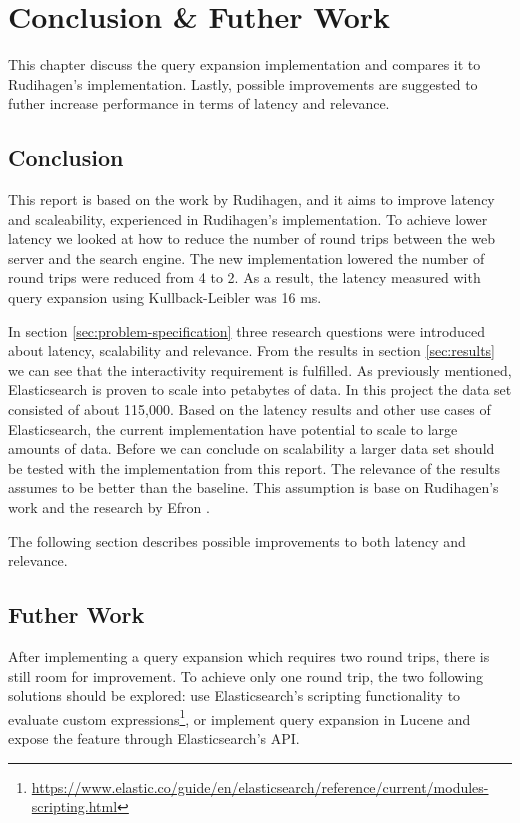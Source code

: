 \chapter{Conclusion \& Futher Work}
\label{ch:conclusion}
This chapter discuss the query expansion implementation and compares it to Rudihagen's implementation.
Lastly, possible improvements are suggested to futher increase performance in terms of latency and relevance.

\section{Conclusion}
This report is based on the work by Rudihagen, and it aims to improve latency and scaleability, experienced in Rudihagen's implementation.
To achieve lower latency we looked at how to reduce the number of round trips between the web server and the search engine.
The new implementation lowered the number of round trips were reduced from 4 to 2.
As a result, the latency measured with query expansion using Kullback-Leibler was 16 ms.

In section \ref{sec:problem-specification} three research questions were introduced about latency, scalability and relevance.
From the results in section \ref{sec:results} we can see that the interactivity requirement is fulfilled.
As previously mentioned, Elasticsearch is proven to scale into petabytes of data.
In this project the data set consisted of about 115,000.
Based on the latency results and other use cases of Elasticsearch,
the current implementation have potential to scale to large amounts of data.
Before we can conclude on scalability a larger data set should be tested with the implementation from this report.
The relevance of the results assumes to be better than the baseline.
This assumption is base on Rudihagen's work and the research by Efron \cite{ir-hashtag}.

The following section describes possible improvements to both latency and relevance.

\section{Futher Work}
After implementing a query expansion which requires two round trips, there is still room for improvement.
To achieve only one round trip, the two following solutions should be explored:
use Elasticsearch's scripting functionality to evaluate custom expressions\footnote{\url{https://www.elastic.co/guide/en/elasticsearch/reference/current/modules-scripting.html}},
or implement query expansion in Lucene and expose the feature through Elasticsearch's API.

